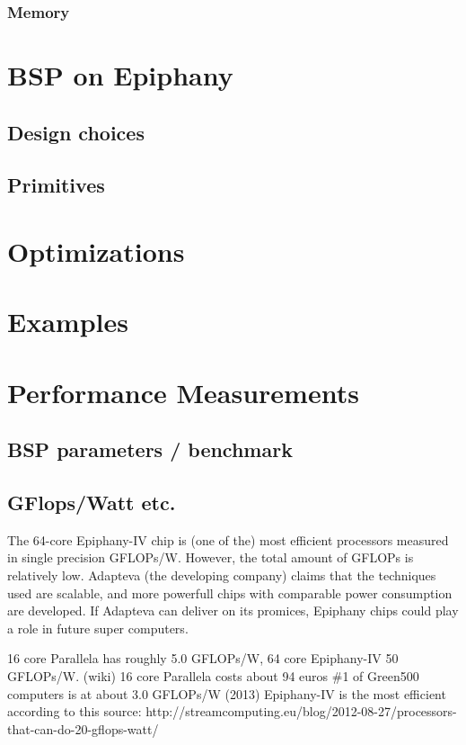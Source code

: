 \documentclass{article}
\renewcommand{\(}{\left(}
\renewcommand{\)}{\right)}
\begin{document}
\subsubsection{Memory}

\section{BSP on Epiphany}

\subsection{Design choices}

\subsection{Primitives}

\section{Optimizations}

\section{Examples}

\section{Performance Measurements}

\subsection{BSP parameters / benchmark}

\subsection{GFlops/Watt etc.}
The 64-core Epiphany-IV chip is (one of the) most efficient processors measured in single precision GFLOPs/W. However, the total amount of GFLOPs is relatively low. Adapteva (the developing company) claims that the techniques used are scalable, and more powerfull chips with comparable power consumption are developed. If Adapteva can deliver on its promices, Epiphany chips could play a role in future super computers.

16 core Parallela has roughly 5.0 GFLOPs/W, 64 core Epiphany-IV 50 GFLOPs/W. (wiki)
16 core Parallela costs about 94 euros
\#1 of Green500 computers is at about 3.0 GFLOPs/W (2013)
Epiphany-IV is the most efficient according to this source:
http://streamcomputing.eu/blog/2012-08-27/processors-that-can-do-20-gflops-watt/
\end{document}
